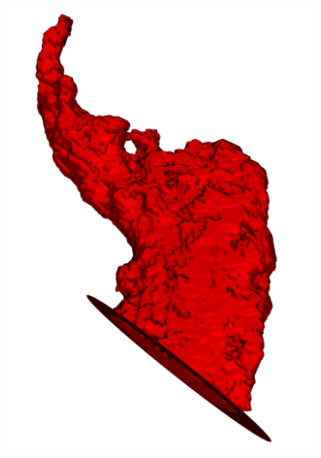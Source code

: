 \documentclass[review]{elsarticle}
\begin{document}
\begin{figure}[t]
\begin{subfigure}[b]{.12\linewidth}
  \end{subfigure}%
  \begin{subfigure}[b]{.12\linewidth}
    \centering
    \includegraphics[width=\textwidth]{fig11_4.png}
  \end{subfigure}%
  \begin{subfigure}[b]{.12\linewidth}
    \centering

\end{subfigure}
\end{figure}
\end{document}

